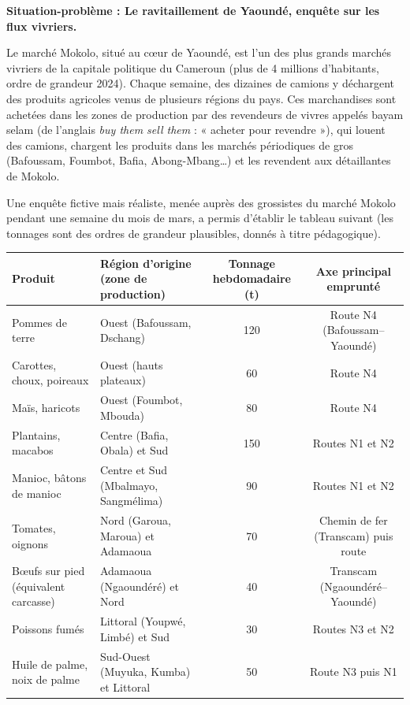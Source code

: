 \documentclass[11pt]{article}
\newcommand{\cle}[1]{{\popxbold\color{popdark}#1}}
\begin{document}
\textbf{Situation-problème : Le ravitaillement de Yaoundé, enquête sur les flux vivriers.}\par
Le marché Mokolo, situé au cœur de Yaoundé, est l'un des plus grands marchés vivriers de la capitale politique du Cameroun (plus de 4 millions d'habitants, ordre de grandeur 2024). Chaque semaine, des dizaines de camions y déchargent des produits agricoles venus de plusieurs régions du pays. Ces marchandises sont achetées dans les zones de production par des revendeurs de vivres appelés \cle{bayam selam} (de l'anglais \emph{buy them sell them} : « acheter pour revendre »), qui louent des camions, chargent les produits dans les marchés périodiques de gros (Bafoussam, Foumbot, Bafia, Abong-Mbang\ldots) et les revendent aux détaillantes de Mokolo.

Une enquête fictive mais réaliste, menée auprès des grossistes du marché Mokolo pendant une semaine du mois de mars, a permis d'établir le tableau suivant (les tonnages sont des ordres de grandeur plausibles, donnés à titre pédagogique).

\begin{center}
\begin{tabularx}{\linewidth}{|l|X|c|c|}
\hline
\rowcolor{popblueL} \textbf{Produit} & \textbf{Région d'origine (zone de production)} & \textbf{Tonnage hebdomadaire (t)} & \textbf{Axe principal emprunté} \\
\hline
Pommes de terre & Ouest (Bafoussam, Dschang) & 120 & Route N4 (Bafoussam--Yaoundé) \\
\hline
Carottes, choux, poireaux & Ouest (hauts plateaux) & 60 & Route N4 \\
\hline
Maïs, haricots & Ouest (Foumbot, Mbouda) & 80 & Route N4 \\
\hline
Plantains, macabos & Centre (Bafia, Obala) et Sud & 150 & Routes N1 et N2 \\
\hline
Manioc, bâtons de manioc & Centre et Sud (Mbalmayo, Sangmélima) & 90 & Routes N1 et N2 \\
\hline
Tomates, oignons & Nord (Garoua, Maroua) et Adamaoua & 70 & Chemin de fer (Transcam) puis route \\
\hline
B\oe ufs sur pied (équivalent carcasse) & Adamaoua (Ngaoundéré) et Nord & 40 & Transcam (Ngaoundéré--Yaoundé) \\
\hline
Poissons fumés & Littoral (Youpwé, Limbé) et Sud & 30 & Routes N3 et N2 \\
\hline
Huile de palme, noix de palme & Sud-Ouest (Muyuka, Kumba) et Littoral & 50 & Route N3 puis N1 \\
\hline
\end{tabularx}
\end{center}
\end{document}
